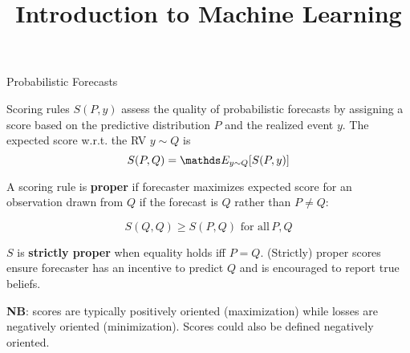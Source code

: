 \documentclass[11pt,compress,t,notes=noshow, xcolor=table]{beamer}
\title{Introduction to Machine Learning}
\begin{document}
    

\begin{vbframe}{Probabilistic Forecasts }

Scoring rules $S(P,y)$ assess the quality of probabilistic forecasts by assigning a score based on the predictive distribution $P$ and the realized event $y$. The expected score w.r.t. the RV $y \sim Q$ is
$$ S(P,Q) = \E_{y \sim Q}[S(P,y)]$$



A scoring rule is \textbf{proper} if forecaster maximizes expected score for an observation drawn from $Q$ if the forecast is $Q$ rather than $P \neq Q$:

$$S(Q,Q) \geq S(P,Q) \,\, \text{for all} \, P,Q $$

\vspace{0.2cm}

$S$ is \textbf{strictly proper} when equality holds iff $P=Q$. (Strictly) proper scores ensure forecaster has an incentive to predict $Q$ and is encouraged to report true beliefs.

\vspace{0.2cm}

{\footnotesize \textbf{NB}: scores are typically positively oriented (maximization) while losses are negatively oriented (minimization). Scores could also be defined negatively oriented.}

\end{vbframe}
\end{document}
